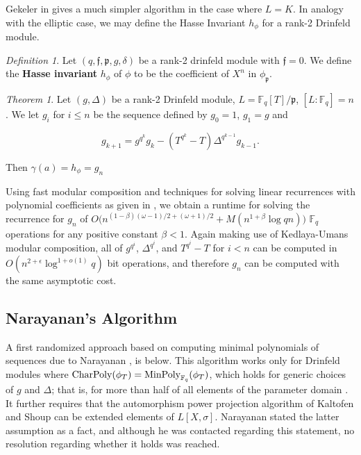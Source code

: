 \documentclass{acmart}
\theoremstyle{remark}
\numberwithin{equation}{section}
\newtheorem{definition}{Definition}
\newtheorem{theorem}{Theorem}
\newcommand{\minpol}{\textnormal{MinPoly}_{\mathbb{F}_q}}
\begin{document}
Gekeler in \cite{frobdist} gives a much simpler algorithm in the case where $L = K$. In analogy with the elliptic case, we may define the Hasse Invariant $h_{\phi}$ for a rank-2 Drinfeld module. 
\begin{definition}
Let $(q, \mathfrak{f}, \mathfrak{p}, g, \delta)$ be a rank-2 drinfeld module with $\mathfrak{f} = 0$. We define the \textbf{Hasse invariant} $h_{\phi}$ of $\phi$ to be the coefficient of $X^{n}$ in $\phi_{\mathfrak{p}}$.
\end{definition}


\begin{theorem}

Let $(g,\Delta)$ be a rank-2 Drinfeld module, $L = \mathbb{F}_q[T]/\mathfrak{p}$, $[L : \mathbb{F}_q] = n$. We let $g_i$ for $i \leq n$ be the sequence defined by $g_0 = 1$, $g_1 = g$ and

\[ g_{k+1} = g^{q^{k}} g_{k} - (T^{q^{k}} - T) \Delta^{q^{k-1}} g_{k-1}.\]

\noindent Then $\gamma(a) = h_{\phi} = g_n$

\end{theorem}

Using fast modular composition and techniques for solving linear recurrences with polynomial coefficients as given in \cite{eschost2017arXiv171200669D}, we obtain a runtime for solving the recurrence for $g_n$ of $O\big(n^{(1-\beta)(\omega - 1)/2 + (\omega + 1)/2 } + M(n^{1 + \beta} \log qn) \big)$ $\mathbb{F}_q$ operations for any positive constant $\beta < 1$. Again making use of Kedlaya-Umans modular composition, all of $g^{q^i}$, $\Delta^{q^i}$, and $T^{q^i} - T$ for $i < n$ can be computed in $O( n^{2 + \epsilon} \log^{1 + o(1)} q)$ bit operations, and therefore $g_n$ can be computed with the same asymptotic cost.

\subsection{Narayanan's Algorithm}

A first randomized approach based on computing minimal polynomials of sequences due to Narayanan \cite[3.1]{DBLP:journals/corr/Narayanan15}, is below. This algorithm works only for Drinfeld modules where $\textnormal{CharPoly}(\phi_T) = \minpol(\phi_T)$, which holds for generic choices of $g$ and $\Delta$; that is, for more than half of all elements of the parameter domain \cite[theorem 3.6]{DBLP:journals/corr/Narayanan15}. It further requires that the automorphism power projection algorithm of Kaltofen and Shoup can be extended elements of $L[X,\sigma]$. Narayanan stated the latter assumption as a fact, and although he was contacted regarding this statement, no resolution regarding whether it holds was reached.
\end{document}
